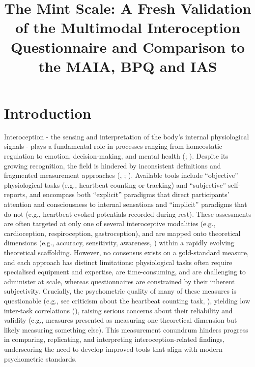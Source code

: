 \documentclass[
  jou,
  floatsintext,
  longtable,
  nolmodern,
  notxfonts,
  notimes,
  colorlinks=true,linkcolor=blue,citecolor=blue,urlcolor=blue]{apa7}
\title{\textbf{The Mint Scale: A Fresh Validation of the Multimodal
Interoception Questionnaire and Comparison to the MAIA, BPQ and IAS}}
\begin{document}
\maketitle



\setcounter{secnumdepth}{-\maxdimen} %

\setlength\LTleft{0pt}




\section{Introduction}\label{introduction}

Interoception - the sensing and interpretation of the body's internal
physiological signals - plays a fundamental role in processes ranging
from homeostatic regulation to emotion, decision-making, and mental
health (;
). Despite its growing recognition, the field is hindered by
inconsistent definitions and fragmented measurement approaches
(,
;
). Available
tools include ``objective'' physiological tasks (e.g., heartbeat
counting or tracking) and ``subjective'' self-reports, and encompass
both ``explicit'' paradigms that direct participants' attention and
consciousness to internal sensations and ``implicit'' paradigms that do
not (e.g., heartbeat evoked potentials recorded during rest). These
assessments are often targeted at only one of several interoceptive
modalities (e.g., cardioception, respiroception, gastroception), and are
mapped onto theoretical dimensions (e.g., accuracy, sensitivity,
awareness, )
within a rapidly evolving theoretical scaffolding. However, no consensus
exists on a gold-standard measure, and each approach has distinct
limitations: physiological tasks often require specialised equipment and
expertise, are time-consuming, and are challenging to administer at
scale, whereas questionnaires are constrained by their inherent
subjectivity. Crucially, the psychometric quality of many of these
measures is questionable (e.g., see criticism about the heartbeat
counting task, ), yielding low inter-task correlations
(), raising
serious concerns about their reliability and validity (e.g., measures
presented as measuring one theoretical dimension but likely measuring
something else). This measurement conundrum hinders progress in
comparing, replicating, and interpreting interoception-related findings,
underscoring the need to develop improved tools that align with modern
psychometric standards.
\end{document}
